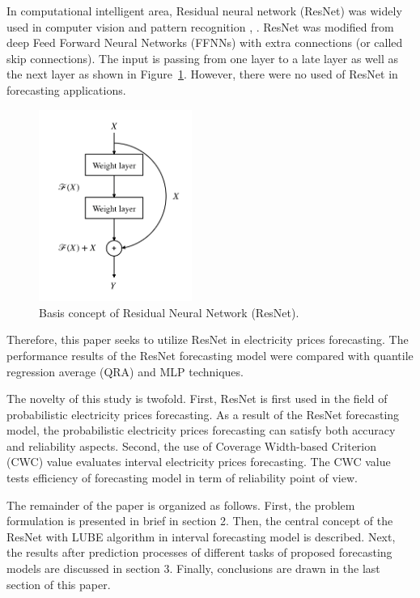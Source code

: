 \documentclass[review]{elsarticle}
\begin{document}
    In computational intelligent area, Residual neural network (ResNet) was widely used in computer vision and pattern recognition \cite{DBLP:journals/corr/HeZRS15}, \cite{DBLP:journals/corr/ZagoruykoK16}.
    ResNet was modified from deep Feed Forward Neural Networks (FFNNs) with extra connections (or called skip connections). The input is passing from one layer to a late layer as well as the next layer as shown in Figure~\ref{Fig:Basic_DRNN}.
    However, there were no used of ResNet in forecasting applications.

    \begin{figure}[H]
      \centering
      \includegraphics[width=5cm]{basic_DRNN}
      \caption{Basis concept of Residual Neural Network (ResNet).}
      \label{Fig:Basic_DRNN}
    \end{figure}

    Therefore, this paper seeks to utilize ResNet in electricity prices forecasting.
    The performance results of the ResNet forecasting model were compared with quantile regression average (QRA) \cite{Maciejowska2016} and MLP techniques.

    The novelty of this study is twofold.
    First, ResNet is first used in the field of probabilistic electricity prices forecasting. As a result of the ResNet forecasting model, the probabilistic electricity prices forecasting can satisfy both accuracy and reliability aspects.
    Second, the use of Coverage Width-based Criterion (CWC) value evaluates interval electricity prices forecasting. The CWC value tests efficiency of forecasting model in term of reliability point of view.

    The remainder of the paper is organized as follows.
    First, the problem formulation is presented in brief in section 2.
    Then, the central concept of the ResNet with LUBE algorithm in interval forecasting model is described.
    Next, the results after prediction processes of different tasks of proposed forecasting models are discussed in section 3.
    Finally, conclusions are drawn in the last section of this paper.
\end{document}
